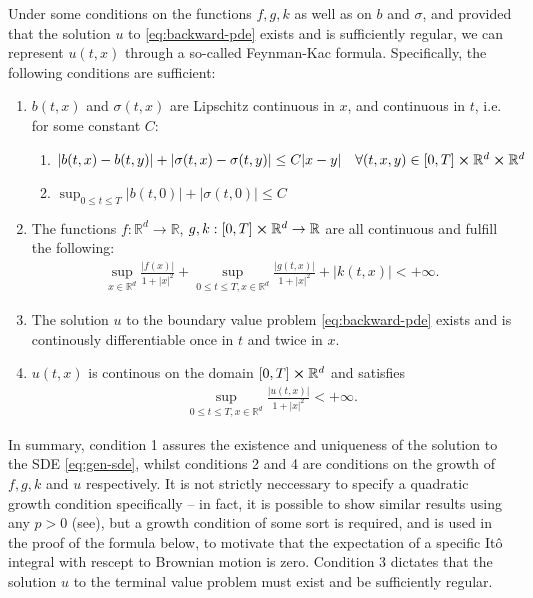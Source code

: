 Under some conditions on the functions $f, g, k$ as well as on $b$ and $\sigma$, and provided that the solution $u$ to \autoref{eq:backward-pde} exists and is sufficiently regular, we can represent $u(t,x)$ through a so-called Feynman-Kac formula. Specifically, the following conditions are sufficient:

\begin{enumerate}
    \item $b(t,x)$ and $\sigma(t,x)$ are Lipschitz continuous in $x$, and continuous in $t$, i.e. for some constant $C$: \begin{enumerate}
        \item $\lvert b(t,x) - b(t,y) \rvert + \lvert \sigma(t,x) - \sigma(t,y) \rvert \leq C \lvert x - y \rvert \quad \forall (t,x,y) \in [0,T]\cross \mathbb{R}^d \cross \mathbb{R}^d$
        \item $ \sup_{0\leq t \leq T} \lvert b(t,0) \rvert + \lvert \sigma(t,0) \rvert \leq C$
    \end{enumerate}
    \item The functions $f:\mathbb{R}^d \rightarrow \mathbb{R}$, $g,k : [0,T]\cross \mathbb{R}^d \rightarrow \mathbb{R}$ are all continuous and fulfill the following:
    \begin{align} 
        \sup_{x \in \mathbb{R}^d} \frac{\lvert f(x) \rvert}{1 + {\lvert x \rvert} ^2} + \sup_{0 \leq t \leq T, x \in \mathbb{R}^d} \frac{\lvert g(t,x) \rvert}{1 + {\lvert x \rvert}^2} + \lvert k(t,x) \rvert < + \infty.
    \end{align}
    \item The solution $u$ to the boundary value problem \autoref{eq:backward-pde} exists and is continously differentiable once in $t$ and twice in $x$.
    \item $u(t,x)$ is continous on the domain $[0,T]\cross\mathbb{R}^d$ and satisfies 
    \begin{align} 
        \sup_{0\leq t \leq T, x \in \mathbb{R}^d} \frac{\lvert u(t,x) \rvert}{1 + {\lvert x \rvert}^2} < + \infty.
    \end{align}
\end{enumerate}
In summary, condition 1 assures the existence and uniqueness of the solution to the SDE \autoref{eq:gen-sde}, whilst conditions 2 and 4 are conditions on the growth of $f,g,k$ and $u$ respectively. It is not strictly neccessary to specify a quadratic growth condition specifically -- in fact, it is possible to show similar results using any $p>0$ (see\cite{gobet2016monte}), but a growth condition of some sort is required, and is used in the proof of the formula below, to motivate that the expectation of a specific Itô integral with rescept to Brownian motion is zero. Condition 3 dictates that the solution $u$ to the terminal value problem must exist and be sufficiently regular. 

